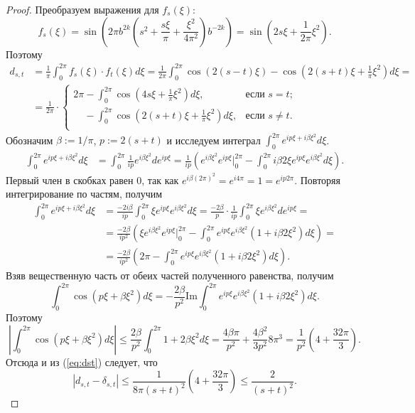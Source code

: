 \documentclass[3p]{cmmp}%
\numberwithin{equation}{section}
\begin{document}
\begin{proof}
	Преобразуем выражения для $f_s(\xi)$:
	\[
	f_s(\xi)
	=
	\sin \left(2\pi b^{2k}\left(s^2 + \frac{s\xi}{\pi}+\frac{\xi^2}{4\pi^2}\right)b^{-2k}\right)
	=
	\sin \left(2s\xi+\frac{1}{2\pi}\xi^2\right).
	\]
	Поэтому
	\begin{align}
	d_{s,t}
	&=
	\frac{1}{\pi} \int_{0}^{2\pi} f_s(\xi) \cdot f_t(\xi) d\xi 
	=
	\frac{1}{2\pi} \int_{0}^{2\pi}\cos \left(2(s-t)\xi\right) - \cos \left(2(s+t)\xi + \frac{1}{\pi}\xi^2\right) d\xi	
	= \nonumber \\ &=
	\label{eq:dst}
	\frac{1}{2\pi}\cdot
	\begin{cases}
	2\pi - \int_0^{2\pi} \cos\left(4s\xi+\frac{1}{\pi}\xi^2\right)d\xi, & \text{если $s=t$;} \\
	\phantom{2\pi} - \int_0^{2\pi} \cos\left(2(s+t)\xi+\frac{1}{\pi}\xi^2\right)d\xi, & \text{если $s\neq t$.} \\
	\end{cases}
	\end{align}
	Обозначим $\beta := 1/\pi$, $p := 2(s+t)$ и исследуем интеграл $\int_0^{2\pi}e^{ip\xi + i\beta\xi^2}d\xi$.
	\begin{align*}
	\int_0^{2\pi}e^{ip\xi + i\beta\xi^2}d\xi
	&=
	\int_0^{2\pi} \frac{1}{ip}e^{i\beta\xi^2}d e^{ip\xi} 
	=
	\frac{1}{ip} \left(e^{i\beta\xi^2}e^{ip\xi}\Big|_0^{2\pi} - \int_0^{2\pi}i\beta 2\xi e^{ip\xi} e^{i\beta\xi^2}d\xi\right).
	\end{align*}
	Первый член в скобках равен $0$, так как $e^{i\beta(2\pi)^2} = e^{i4\pi} = 1 = e^{ip2\pi}$.
	Повторяя интегрирование по частям, получим
	\begin{align*}
	\int_0^{2\pi}e^{ip\xi + i\beta\xi^2}d\xi 
	&= 
	\frac{-2i\beta}{ip} \int_0^{2\pi}\xi e^{ip\xi}e^{i\beta \xi^2}d\xi
	=
	\frac{-2\beta}{p}\cdot\frac{1}{ip} \int_{0}^{2\pi} \xi e^{i\beta\xi^2}d e^{ip\xi}
	= \\ &=
	\frac{-2\beta}{i p^2} \left( \xi e^{i\beta \xi^2}e^{ip\xi} \Big|_0^{2\pi} - \int_0^{2\pi}e^{ip\xi}e^{i\beta \xi^2}\left( 1+i\beta 2\xi^2\right)d\xi \right)
	= \\ &=
	\frac{-2\beta}{ip^2}\left(2\pi -  \int_0^{2\pi}e^{ip\xi}e^{i\beta \xi^2}\left( 1+i\beta 2\xi^2\right)d\xi\right).
	\end{align*}
	Взяв вещественную часть от обеих частей полученного равенства, получим
	\[
	\int_0^{2\pi} \cos(p\xi + \beta\xi^2) d\xi = -\frac{2\beta}{p^2}\mathrm{Im} \int_0^{2\pi}e^{ip\xi}e^{i\beta \xi^2}\left( 1+i\beta 2\xi^2\right)d\xi.
	\]
	Поэтому
	\[
	\left|\int_0^{2\pi} \cos(p\xi + \beta\xi^2) d\xi\right|
	\le
	\frac{2\beta}{p^2}\int_0^{2\pi}1 + 2\beta\xi^2d\xi
	=
	\frac{4\beta \pi}{p^2} + \frac{4\beta^2}{3p^2}8\pi^3 = \frac{1}{p^2}\left(4 + \frac{32\pi}{3}\right).
	\]
	Отсюда и из (\ref{eq:dst}) следует, что
	\[
	|d_{s,t} - \delta_{s,t}| \leq \frac{1}{8\pi(s+t)^2}\left(4 + \frac{32\pi}{3}\right) \leq \frac{2}{(s+t)^2}.
	\]
\end{proof}
\end{document}
